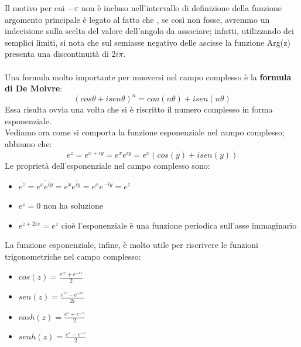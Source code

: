 Il motivo per cui $-\pi$ non è incluso nell'intervallo di definizione della funzione argomento principale è legato al fatto che , se così non fosse, avremmo un indecisione sulla scelta del valore dell'angolo da associare; infatti, utilizzando dei semplici limiti, si nota che sul semiasse negativo delle ascisse la funzione Arg(z) presenta una discontinuità di $2i\pi$.
\\
\\
Una formula molto importante per muoversi nel campo complesso è la \textbf{formula di De Moivre}:
\begin{equation}
(cos\theta + i sen\theta)^n =con(n\theta) + i sen(n\theta)
\end{equation}
Essa risulta ovvia una volta che si è riscritto il numero complesso in forma esponenziale.\\Vediamo ora come si comporta la funzione esponenziale nel campo complesso; abbiamo che:
$$e^z=e^{x+iy}=e^x e^{iy} =e^x (cos(y)+isen(y))$$
Le proprietà dell'esponenziale nel campo complesso sono:

\begin{itemize}
\item $\overline{e^z}=\overline{e^x e^{iy}}=\overline{e^x} \overline{e^{iy}} =e^x e^{-iy} =e^ {\overline{z}}$
\item $e^z =0$ non ha soluzione
\item $e^{z+2i\pi}=e^z$ cioè l'esponenziale è una funzione periodica sull'asse immaginario
\end{itemize}

La funzione esponenziale, infine, è molto utile per riscrivere le funzioni trigonometriche nel campo complesso:

\begin{itemize}
\item $cos(z)=\frac{e^{iz}+e^{-iz}}{2}$
\item $sen(z)=\frac{e^{iz}-e^{-iz}}{2i}$
\item $cosh(z)=\frac{e^z+e^{-z}}{2}$
\item $senh(z)=\frac{e^z-e^{-z}}{2}$
\end{itemize}

